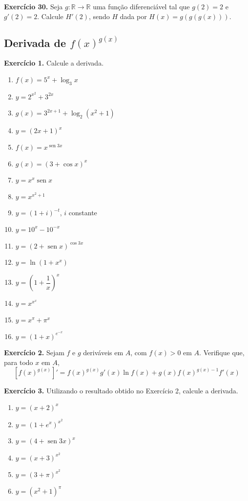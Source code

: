 \documentclass[12pt,a4paper]{article}
\begin{document}
\vspace{0.5cm}
\noindent\textbf{Exercício 30.}
Seja $g\colon \mathbb{R} \to \mathbb{R}$ uma função diferenciável tal que $g(2) = 2$ e $g'(2) = 2$. Calcule $H'(2)$, sendo $H$ dada por $H(x) = g(g(g(x)))$.

\subsection{Derivada de $f(x)^{g(x)}$}
\vspace{0.5cm}
\noindent\textbf{Exercício 1.} Calcule a derivada.
\begin{enumerate}
    \renewcommand{\theenumi}{\alph{enumi}}
    \renewcommand{\labelenumi}{\theenumi)}
    \item $f(x) = 5^x + \log_3 x$
    \item $y = 2^{x^2} + 3^{2x}$
    \item $g(x) = 3^{2x + 1} + \log_2 (x^2 + 1)$
    \item $y = (2x + 1)^x$
    \item $f(x) = x^{\operatorname{sen} 3x}$
    \item $g(x) = (3 + \cos x)^x$
    \item $y = x^x \operatorname{sen} x$
    \item $y = x^{x^2 + 1}$
    \item $y = (1 + i)^{-t}$, $i$ constante
    \item $y = 10^x - 10^{-x}$
    \item $y = (2 + \operatorname{sen} x)^{\cos 3x}$
    \item $y = \ln(1 + x^x)$
    \item $y = \left(1 + \dfrac{1}{x}\right)^{\!x}$
    \item $y = x^{x^x}$
    \item $y = x^\pi + \pi^x$
    \item $y = (1 + x)^{e^{-x}}$
\end{enumerate}

\vspace{0.5cm}
\noindent\textbf{Exercício 2.}
Sejam $f$ e $g$ deriváveis em $A$, com $f(x) > 0$ em $A$. Verifique que, para todo $x$ em $A$,
\[
[f(x)^{g(x)}]' = f(x)^{g(x)} g'(x) \ln f(x) + g(x) f(x)^{g(x) - 1} f'(x)
\]

\vspace{0.5cm}
\noindent\textbf{Exercício 3.}
Utilizando o resultado obtido no Exercício 2, calcule a derivada.
\begin{enumerate}
    \renewcommand{\theenumi}{\alph{enumi}}
    \renewcommand{\labelenumi}{\theenumi)}
    \item $y = (x + 2)^x$
    \item $y = (1 + e^x)^{x^2}$
    \item $y = (4 + \operatorname{sen} 3x)^x$
    \item $y = (x + 3)^{x^2}$
    \item $y = (3 + \pi)^{x^2}$
    \item $y = (x^2 + 1)^\pi$
\end{enumerate}
\end{document}
